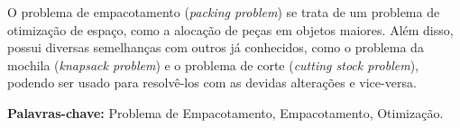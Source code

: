 
\begin{resumo}
    O problema de empacotamento (\textit{packing problem}) se trata de um problema de otimização de espaço, como a alocação de peças em objetos maiores.
    Além disso, possui diversas semelhanças com outros já conhecidos, como o problema da mochila (\textit{knapsack problem}) e o problema de corte (\textit{cutting stock problem}), podendo ser usado para resolvê-los com as devidas alterações e vice-versa.
    
    \textbf{Palavras-chave:} Problema de Empacotamento, Empacotamento, Otimização.
\end{resumo}
\newpage

